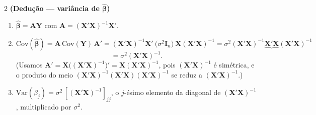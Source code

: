 \documentclass[11pt]{article}
\begin{document}
\begin{questao}{2} \textbf{(Dedução --- variância de $\hat{\boldsymbol\beta}$)}
\end{questao}
\begin{solucao}
\begin{enumerate}[label=(\alph*)]
  \item $\hat{\boldsymbol\beta} = \mathbf{A}\mathbf{Y}$ com
    $\mathbf{A} = (\mathbf{X}'\mathbf{X})^{-1}\mathbf{X}'$.
  \item
  $$
  \mathrm{Cov}(\hat{\boldsymbol\beta}) = \mathbf{A}\,\mathrm{Cov}(\mathbf{Y})\,\mathbf{A}' =
  (\mathbf{X}'\mathbf{X})^{-1}\mathbf{X}'\ \big(\sigma^2\mathbf{I}_n\big)\
  \mathbf{X}(\mathbf{X}'\mathbf{X})^{-1} = \sigma^2 (\mathbf{X}'\mathbf{X})^{-1}
  \underbrace{\mathbf{X}'\mathbf{X}}_{}(\mathbf{X}'\mathbf{X})^{-1}
  $$
  $$
  = \sigma^2 (\mathbf{X}'\mathbf{X})^{-1}.
  $$
  (Usamos $\mathbf{A}' = \mathbf{X}\big((\mathbf{X}'\mathbf{X})^{-1}\big)' =
  \mathbf{X}(\mathbf{X}'\mathbf{X})^{-1}$, pois $(\mathbf{X}'\mathbf{X})^{-1}$ é simétrica, e o
  produto do meio $(\mathbf{X}'\mathbf{X})^{-1}(\mathbf{X}'\mathbf{X})(\mathbf{X}'\mathbf{X})^{-1}$
  se reduz a $(\mathbf{X}'\mathbf{X})^{-1}$.)
  \item $\mathrm{Var}(\hat\beta_j) = \sigma^2\, [(\mathbf{X}'\mathbf{X})^{-1}]_{jj}$, o $j$-ésimo
    elemento da diagonal de $(\mathbf{X}'\mathbf{X})^{-1}$, multiplicado por $\sigma^2$.
\end{enumerate}
\end{solucao}
\end{document}
